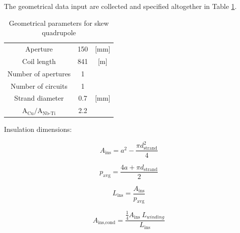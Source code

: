 \documentclass{article}
\begin{document}
The geometrical data input are collected and specified altogether in Table \ref{table:skew_quad_params_table}.

\begin{table}[h!]
    \caption{Geometrical parameters for skew quadrupole \cite{hl_lhc_tech_design_report_v01, marco_prioli_mails}} 
    \vspace{-1.em} 
    \fontsize{10}{10}
    \selectfont 
    \renewcommand{\arraystretch}{1.5}
    \begin{center}
    \begin{tabular}{ ccc }  
    \hline
    Aperture & 150 & [mm]\\
    Coil length & 841 & [m] \\
    Number of apertures & 1 & \\
    Number of circuits & 1 & \\
    Strand diameter & 0.7 & [mm] \\
    $\text{A}_\text{Cu}/\text{A}_\text{Nb-Ti}$ \cite{marco_prioli_mails} & 2.2 & \\
    \hline 
    \end{tabular}
    \end{center}  
     \label{table:skew_quad_params_table} 
 \end{table}

Insulation dimensions:

\begin{equation}
    A_\text{ins} = a^2 - \frac{\pi d_\text{strand}^2}{4}
\end{equation}

\begin{equation}
    p_\text{avg} = \frac{4 a + \pi d_\text{strand}}{2} 
\end{equation}

\begin{equation}
    L_\text{ins} = \frac{A_\text{ins}}{p_\text{avg}}
\end{equation}

\begin{equation}
    A_\text{ins,cond} = \frac{\frac{1}{4} A_\text{ins} ~ L_{winding}}{L_\text{ins}}
\end{equation}
\end{document}
